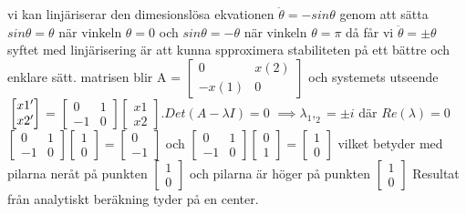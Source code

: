 \documentclass{article}
\begin{document}
\bigbreak
\bigbreak
vi kan linjäriserar den dimesionslösa ekvationen $\ddot{\theta} = -sin{\theta} $ genom att sätta $sin{\theta} = {\theta}$ när vinkeln ${\theta} = 0$ och $sin{\theta} = -{\theta}$ när vinkeln $ {\theta} =  {\pi} $ då får vi $\ddot{\theta} = \pm {\theta} $ 
syftet med linjärisering är att kunna spproximera stabiliteten på ett bättre och enklare sätt. 
matrisen blir A =  $ \begin{bmatrix} 0 & x(2) \\ -x(1) & 0 \end{bmatrix} $ och systemets utseende $\newline \begin{bmatrix} x1' \\ x2' \end{bmatrix} $ =  $ \begin{bmatrix} 0 & 1 \\ -1 & 0 \end{bmatrix} \begin{bmatrix} x1 \\ x2 \end{bmatrix}. Det(A-{\lambda}I) = 0$
$ \implies \lambda_1,_2 = \pm i $ där $Re({\lambda})=0 $ \newline
$ \begin{bmatrix} 0 & 1 \\ -1 & 0 \end{bmatrix} \begin{bmatrix} 1 \\ 0 \end{bmatrix} = \begin{bmatrix} 0 \\ -1 \end{bmatrix} $ och $ \begin{bmatrix} 0 & 1 \\ -1 & 0 \end{bmatrix} \begin{bmatrix} 0 \\ 1 \end{bmatrix} = \begin{bmatrix} 1 \\ 0 \end{bmatrix} $ vilket betyder med pilarna neråt på punkten $ \begin{bmatrix} 1 \\ 0 \end{bmatrix} $ och pilarna är höger på punkten $ \begin{bmatrix} 1 \\ 0 \end{bmatrix} $
\newline Resultat från analytiskt beräkning tyder på en center. 
\end{document}

